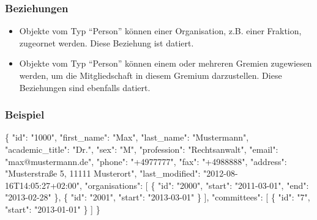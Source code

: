 \documentclass[,a4paper]{article}
\newenvironment{Shaded}{}{}
\newcommand{\DataTypeTok}[1]{\textcolor[rgb]{0.56,0.13,0.00}{{#1}}}
\newcommand{\StringTok}[1]{\textcolor[rgb]{0.25,0.44,0.63}{{#1}}}
\newcommand{\NormalTok}[1]{{#1}}
\begin{document}
\subsubsection{Beziehungen}

\begin{itemize}
\item
  Objekte vom Typ ``Person'' können einer Organisation, z.B. einer
  Fraktion, zugeornet werden. Diese Beziehung ist datiert.
\item
  Objekte vom Typ ``Person'' können einem oder mehreren Gremien
  zugewiesen werden, um die Mitgliedschaft in diesem Gremium
  darzustellen. Diese Beziehungen sind ebenfalls datiert.
\end{itemize}

\subsubsection{Beispiel}

\begin{Shaded}
\begin{Highlighting}[]
\NormalTok{\{}
    \DataTypeTok{"id"}\NormalTok{: }\StringTok{"1000"}\NormalTok{,}
    \DataTypeTok{"first_name"}\NormalTok{: }\StringTok{"Max"}\NormalTok{,}
    \DataTypeTok{"last_name"}\NormalTok{: }\StringTok{"Mustermann"}\NormalTok{,}
    \DataTypeTok{"academic_title"}\NormalTok{: }\StringTok{"Dr."}\NormalTok{,}
    \DataTypeTok{"sex"}\NormalTok{: }\StringTok{"M"}\NormalTok{,}
    \DataTypeTok{"profession"}\NormalTok{: }\StringTok{"Rechtsanwalt"}\NormalTok{,}
    \DataTypeTok{"email"}\NormalTok{: }\StringTok{"max@mustermann.de"}\NormalTok{,}
    \DataTypeTok{"phone"}\NormalTok{: }\StringTok{"+4977777"}\NormalTok{,}
    \DataTypeTok{"fax"}\NormalTok{: }\StringTok{"+4988888"}\NormalTok{,}
    \DataTypeTok{"address"}\NormalTok{: }\StringTok{"Musterstraße 5, 11111 Musterort"}\NormalTok{,}
    \DataTypeTok{"last_modified"}\NormalTok{: }\StringTok{"2012-08-16T14:05:27+02:00"}\NormalTok{,}
    \DataTypeTok{"organisations"}\NormalTok{: [}
        \NormalTok{\{}
            \DataTypeTok{"id"}\NormalTok{: }\StringTok{"2000"}\NormalTok{,}
            \DataTypeTok{"start"}\NormalTok{: }\StringTok{"2011-03-01"}\NormalTok{,}
            \DataTypeTok{"end"}\NormalTok{: }\StringTok{"2013-02-28"}
        \NormalTok{\},}
        \NormalTok{\{}
            \DataTypeTok{"id"}\NormalTok{: }\StringTok{"2001"}\NormalTok{,}
            \DataTypeTok{"start"}\NormalTok{: }\StringTok{"2013-03-01"}
        \NormalTok{\}}
    \NormalTok{],}
    \DataTypeTok{"committees"}\NormalTok{: [}
        \NormalTok{\{}
            \DataTypeTok{"id"}\NormalTok{: }\StringTok{"7"}\NormalTok{,}
            \DataTypeTok{"start"}\NormalTok{: }\StringTok{"2013-01-01"}
        \NormalTok{\}}
    \NormalTok{]}
\NormalTok{\}}
\end{Highlighting}
\end{Shaded}
\end{document}
